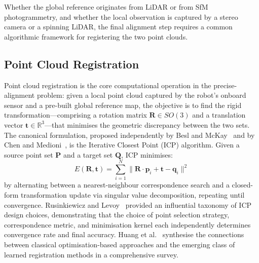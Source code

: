Whether the global reference originates from LiDAR or from SfM photogrammetry, and whether the local observation is captured by a stereo camera or a spinning LiDAR, the final alignment step requires a common algorithmic framework for registering the two point clouds.

\subsection{Point Cloud Registration}
\label{subsec:point-cloud-registration}

Point cloud registration is the core computational operation in the precise-alignment problem: given a local point cloud captured by the robot's onboard sensor and a pre-built global reference map, the objective is to find the rigid transformation---comprising a rotation matrix $\mathbf{R} \in SO(3)$ and a translation vector $\mathbf{t} \in \mathbb{R}^3$---that minimises the geometric discrepancy between the two sets. The canonical formulation, proposed independently by Besl and McKay~\cite{beslMethodRegistration3D1992a} and by Chen and Medioni~\cite{chenObjectModelingRegistration1991}, is the Iterative Closest Point (ICP) algorithm. Given a source point set $\mathbf{P}$ and a target set $\mathbf{Q}$, ICP minimises:
%
\begin{equation}
    E(\mathbf{R}, \mathbf{t}) = \sum_{i=1}^{N} \| \mathbf{R} \cdot \mathbf{p}_i + \mathbf{t} - \mathbf{q}_i \|^2
    \label{eq:icp}
\end{equation}
%
by alternating between a nearest-neighbour correspondence search and a closed-form transformation update via singular value decomposition, repeating until convergence. Rusinkiewicz and Levoy~\cite{rusinkiewiczEfficientVariantsICP2001} provided an influential taxonomy of ICP design choices, demonstrating that the choice of point selection strategy, correspondence metric, and minimisation kernel each independently determines convergence rate and final accuracy. Huang et al.~\cite{huangComprehensiveSurveyPoint2021} synthesise the connections between classical optimisation-based approaches and the emerging class of learned registration methods in a comprehensive survey.

